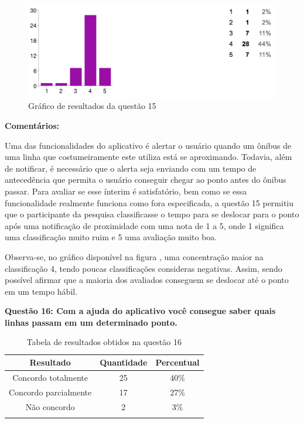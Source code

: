\begin{figure}[h]
\begin{center}
  \includegraphics[width=16cm]{images/graficos/questao15.png}
  \caption{Gráfico de resultados da questão 15}
  \label{fig:questao15}
\end{center}
\end{figure}

\textbf{Comentários:}

Uma das funcionalidades do aplicativo é alertar o usuário quando um ônibus de uma linha que costumeiramente este utiliza está se aproximando. Todavia, além de notificar, é necessário que o alerta seja enviando com um tempo de antecedência que permita o usuário conseguir chegar ao ponto antes do ônibus passar. Para avaliar se esse ínterim é satisfatório, bem como se essa funcionalidade realmente funciona como fora especificada, a questão 15 permitiu que o participante da pesquisa classificasse o tempo para se deslocar para o ponto após uma notificação de proximidade com uma nota de 1 a 5, onde 1 significa uma classificação muito ruim e 5 uma avaliação muito boa.
	
Observa-se, no gráfico disponível na figura , uma concentração maior na classificação 4, tendo poucas classificações consideras negativas. Assim, sendo possível afirmar que a maioria dos avaliados conseguem se deslocar até o ponto em um tempo hábil.\newline

\textbf{Questão 16: Com a ajuda do aplicativo você consegue saber quais linhas passam em um determinado ponto.}

\begin{center}
\begin{longtable}{c|c|c}
\hline
    \multicolumn{1}{c}{\textbf{Resultado}} & \multicolumn{1}{c}{\textbf{Quantidade}} & \multicolumn{1}{c}{\textbf{Percentual}} \\
\hline
    Concordo totalmente & 25 &  40\%\\
    \hline
    Concordo parcialmente & 17 & 27\%\\
    \hline
     Não concordo & 2 & 3\%\\
    \hline
\caption{Tabela de resultados obtidos na questão 16}
\label{tabq16}
\end{longtable}
\end{center}



